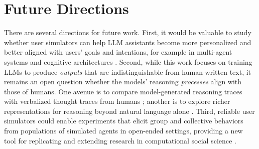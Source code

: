 \documentclass{article} %
\begin{document}




\clearpage

\appendix

\section{Future Directions}
\label{app:future-directions}
There are several directions for future work. First, it would be valuable to study whether user simulators can help LLM assistants become more personalized and better aligned with users' goals and intentions, for example in multi-agent systems \citep{guo2024large, tomavsev2026intelligent} and cognitive architectures \citep{sumers2023cognitive, liu2026cognitive}. Second, while this work focuses on training LLMs to produce \textit{outputs} that are indistinguishable from human-written text, it remains an open question whether the models' reasoning \textit{processes} align with those of humans. One avenue is to compare model-generated reasoning traces with verbalized thought traces from humans \citep{wurgaft2025scaling, kargupta2025cognitive}; another is to explore richer representations for reasoning beyond natural language alone \citep{jha2025modeling, zhang2025code, li2026simulating}. Third, reliable user simulators could enable experiments that elicit group and collective behaviors from populations of simulated agents in open-ended settings, providing a new tool for replicating and extending research in computational social science \citep{lazer2009computational, ziems2024can}.
\end{document}
